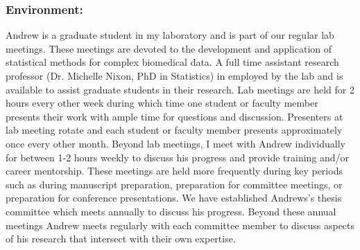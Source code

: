 \documentclass{NIHGrant}
\begin{document}

\subsubsection*{Environment: }

Andrew is a graduate student in my laboratory and is part of our regular lab
meetings. These meetings are devoted to the development and application of
statistical methods for complex biomedical data. A full time assistant research
professor (Dr. Michelle Nixon, PhD in Statistics) in employed by the lab and is
available to assist graduate students in their research. Lab meetings are held
for 2 hours every other week during which time one student or faculty member
presents their work with ample time for questions and discussion. Presenters at
lab meeting rotate and each student or faculty member presents approximately
once every other month. Beyond lab meetings, I meet with Andrew individually for
between 1-2 hours weekly to discuss his progress and provide training and/or
career mentorship. These meetings are held more frequently during key periods
such as during manuscript preparation, preparation for committee meetings, or
preparation for conference presentations. We have established
Andrews's thesis committee which meets annually to discuss his progress. Beyond
these annual meetings Andrew meets regularly with each committee member to
discuss aspects of his research that intersect with their own expertise.
\end{document}
